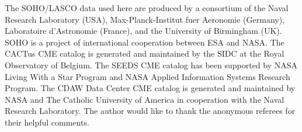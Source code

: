 \documentclass[referee,a4paper,12pt,traditabstract]{swsc}
\begin{document}
\begin{linenumbers}
\begin{acknowledgements}
The SOHO/LASCO data used here are produced by a consortium of the Naval Research Laboratory (USA), Max-Planck-Institut fuer Aeronomie (Germany), Laboratoire d'Astronomie (France), and the University of Birmingham (UK). SOHO is a project of international cooperation between ESA and NASA.
The CACTus CME catalog is generated and maintained by the SIDC at the Royal Observatory of Belgium.
The SEEDS CME catalog has been supported by NASA Living With a Star Program and NASA Applied Information Systems Research Program.
The CDAW Data Center CME catalog is generated and maintained by NASA and The Catholic University of America in cooperation with the Naval Research Laboratory.
The author would like to thank the anonymous referees for their helpful comments.      
     
\end{acknowledgements}


%

  

\end{linenumbers}
\end{document}

